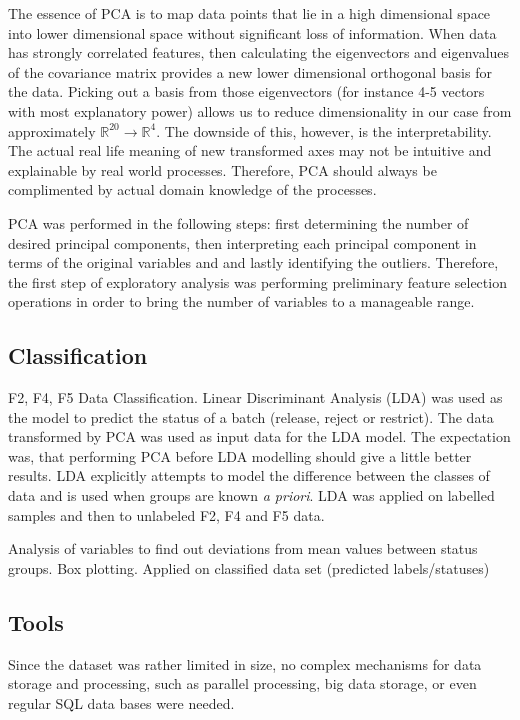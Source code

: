 \documentclass{article}
\begin{document}
The essence of PCA is to map data points that lie in a high dimensional space into lower dimensional space without significant loss of information. When data has strongly correlated features, then calculating the eigenvectors and eigenvalues of the covariance matrix provides a new lower dimensional orthogonal basis for the data. Picking out a basis from those eigenvectors (for instance 4-5 vectors with most explanatory power) allows us to reduce dimensionality in our case from approximately $\mathbb{R}^{20} \to \mathbb{R}^4$. The downside of this, however, is the interpretability. The actual real life meaning of new transformed axes may not be intuitive and explainable by real world processes. Therefore, PCA should always be complimented by actual domain knowledge of the processes.

PCA was performed in the following steps: first determining the number of desired principal components, then interpreting each principal component in terms of the original variables and and lastly identifying the outliers. Therefore, the first step of exploratory analysis was performing preliminary feature selection operations in order to bring the number of variables to a manageable range.
 
 \subsection{Classification}
F2, F4, F5 Data Classification. Linear Discriminant Analysis (LDA) was used as the model to predict the status of a batch (release, reject or restrict). The data transformed by PCA was used as input data for the LDA model. The expectation was, that performing PCA before LDA modelling should give a little better results. LDA explicitly attempts to model the difference between the classes of data and is used when groups are known \emph{a priori}.  LDA was applied on labelled samples and then to unlabeled F2, F4 and F5 data.
 
Analysis of variables to find out deviations from mean values between status groups. Box plotting.  Applied on classified data set (predicted labels/statuses) 

\subsection{Tools}
Since the dataset was rather limited in size, no complex mechanisms for data storage and processing, such as parallel processing, big data storage, or even regular SQL data bases were needed. 
\end{document}
